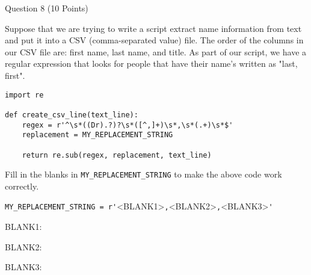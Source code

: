 \documentclass{article}
\begin{document}
\begin{minipage}{\textwidth}
    \noindent
    Question 8 (10 Points)
    \vspace{0.5cm}

    \noindent
    Suppose that we are trying to write a script extract name information from text and put it into a CSV (comma-separated value) file.
    The order of the columns in our CSV file are: first name, last name, and title.
    As part of our script, we have a regular expression that looks for people that have their name's written as "last, first".

    \begin{lstlisting}
import re

def create_csv_line(text_line):
    regex = r'^\s*((Dr).?)?\s*([^,]+)\s*,\s*(.+)\s*$'
    replacement = MY_REPLACEMENT_STRING

    return re.sub(regex, replacement, text_line)
    \end{lstlisting}

    Fill in the blanks in \verb|MY_REPLACEMENT_STRING| to make the above code work correctly.

    \verb|MY_REPLACEMENT_STRING = r'|\textsc{<BLANK1>}\verb|,|\textsc{<BLANK2>}\verb|,|\textsc{<BLANK3>}\verb|'|

    \vspace{0.5cm}

    BLANK1: \underline{\hspace{1cm}}

    BLANK2: \underline{\hspace{1cm}}

    BLANK3: \underline{\hspace{1cm}}

\end{minipage}


\vspace{2cm}

\end{document}
